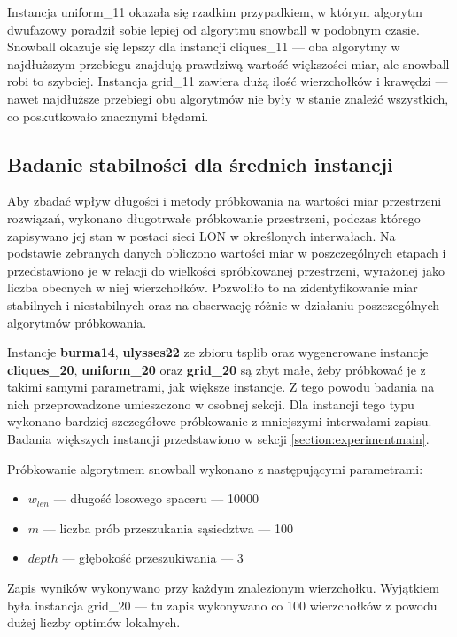 Instancja uniform\_11 okazała się rzadkim przypadkiem, w którym algorytm dwufazowy poradził sobie lepiej od algorytmu snowball w podobnym czasie.
Snowball okazuje się lepszy dla instancji cliques\_11 --- oba algorytmy w najdłuższym przebiegu znajdują prawdziwą wartość większości miar, ale snowball robi to szybciej.
Instancja grid\_11 zawiera dużą ilość wierzchołków i krawędzi --- nawet najdłuższe przebiegi obu algorytmów nie były w stanie znaleźć wszystkich,
co poskutkowało znacznymi błędami.

\subsection{Badanie stabilności dla średnich instancji} \label{section:experimentsmall}
Aby zbadać wpływ długości i metody próbkowania na wartości miar przestrzeni rozwiązań,
wykonano długotrwałe próbkowanie przestrzeni, podczas którego zapisywano jej stan w postaci sieci LON w określonych interwałach.
Na podstawie zebranych danych obliczono wartości miar w poszczególnych etapach i przedstawiono je w relacji do wielkości spróbkowanej przestrzeni,
wyrażonej jako liczba obecnych w niej wierzchołków. Pozwoliło to na zidentyfikowanie miar stabilnych i niestabilnych oraz na obserwację różnic w działaniu poszczególnych
algorytmów próbkowania.

Instancje \textbf{burma14}, \textbf{ulysses22} ze zbioru tsplib oraz wygenerowane instancje
\textbf{cliques\_20}, \textbf{uniform\_20} oraz \textbf{grid\_20}
są zbyt małe, żeby próbkować je z takimi samymi parametrami, jak większe instancje.
Z tego powodu badania na nich przeprowadzone umieszczono w osobnej sekcji.
Dla instancji tego typu wykonano bardziej szczegółowe próbkowanie z mniejszymi interwałami zapisu.
Badania większych instancji przedstawiono w sekcji \ref{section:experimentmain}.

Próbkowanie algorytmem snowball wykonano z następującymi parametrami:
\begin{itemize}
    \item $w_{len}$ --- długość losowego spaceru --- 10000
    \item $m$ --- liczba prób przeszukania sąsiedztwa --- 100
    \item $depth$ --- głębokość przeszukiwania --- 3
\end{itemize}
Zapis wyników wykonywano przy każdym znalezionym wierzchołku.
Wyjątkiem była instancja grid\_20 --- tu zapis wykonywano co 100 wierzchołków z powodu dużej liczby optimów lokalnych.


